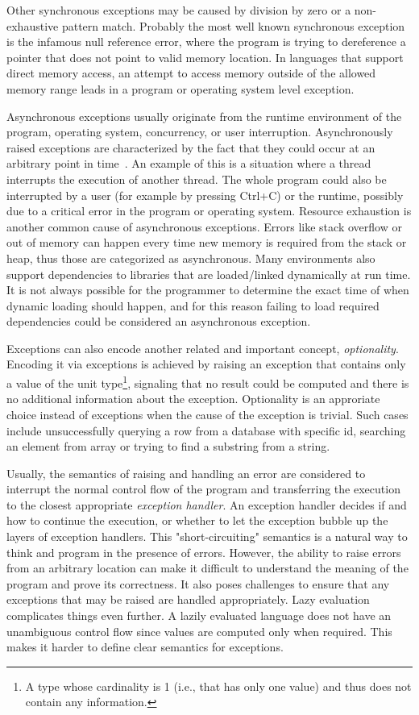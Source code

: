 Other synchronous exceptions may be caused by division by zero or a non-exhaustive pattern match. Probably the most well known synchronous exception is the infamous null reference error, where the program is trying to dereference a pointer that does not point to valid memory location. In languages that support direct memory access, an attempt to access memory outside of the allowed memory range leads in a program or operating system level exception.~\cite{akward-squad}

Asynchronous exceptions usually originate from the runtime environment of the program, operating system, concurrency, or user interruption. Asynchronously raised exceptions are characterized by the fact that they could occur at an arbitrary point in time~\cite{async-exc}. An example of this is a situation where a thread interrupts the execution of another thread. The whole program could also be interrupted by a user (for example by pressing Ctrl+C) or the runtime, possibly due to a critical error in the program or operating system. Resource exhaustion is another common cause of asynchronous exceptions. Errors like stack overflow or out of memory can happen every time new memory is required from the stack or heap, thus those are categorized as asynchronous. Many environments also support dependencies to libraries that are loaded/linked  dynamically at run time. It is not always possible for the programmer to determine the exact time of when dynamic loading should happen, and for this reason failing to load required dependencies could be considered an asynchronous exception.~\cite{akward-squad}

Exceptions can also encode another related and important concept, \textit{optionality}. Encoding it via exceptions is achieved by raising an exception that contains only a value of the unit type\footnote{A type whose cardinality is 1 (i.e., that has only one value) and thus does not contain any information.}, signaling that no result could be computed and there is no additional information about the exception. Optionality is an approriate choice instead of exceptions when the cause of the exception is trivial. Such cases include unsuccessfully querying a row from a database with specific id, searching an element from array or trying to find a substring from a string.

Usually, the semantics of raising and handling an error are considered to interrupt the normal control flow of the program and transferring the execution to the closest appropriate \textit{exception handler}. An exception handler decides if and how to continue the execution, or whether to let the exception bubble up the layers of exception handlers. This "short-circuiting" semantics is a natural way to think and program in the presence of errors. However, the ability to raise errors from an arbitrary location can make it difficult to understand the meaning of the program and prove its correctness. It also poses challenges to ensure that any exceptions that may be raised are handled appropriately. Lazy evaluation complicates things even further. A lazily evaluated language does not have an unambiguous control flow since values are computed only when required. This makes it harder to define clear semantics for exceptions.~\cite{imprecise-exceptions}

